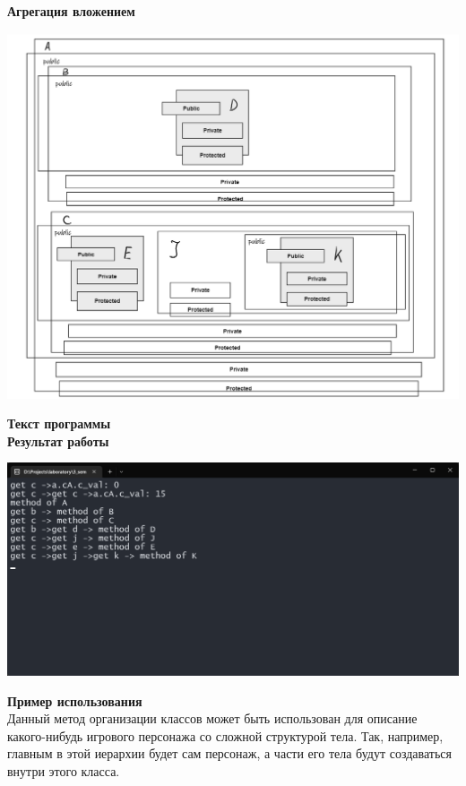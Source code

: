 \documentclass[12pt]{report}
\begin{document}
    \newpage
    \textbf{\large{Агрегация вложением}}\\
    \begin{center}
        \includegraphics[scale=0.7]{formal/screen_3.png}\\  
    \end{center}
    \textbf{Текст программы}\\
    
    \vspace{0.4in}
    \textbf{Результат работы}\\
    \begin{center}
        \includegraphics[scale=0.5]{formal/lab_2_2.png}\\
    \end{center}
    \textbf{Пример использования}\\
    Данный метод организации классов может быть использован для описание какого-нибудь игрового персонажа со сложной структурой тела.
    Так, например, главным в этой иерархии будет сам персонаж, а части его тела будут создаваться внутри этого класса. 
\end{document}

